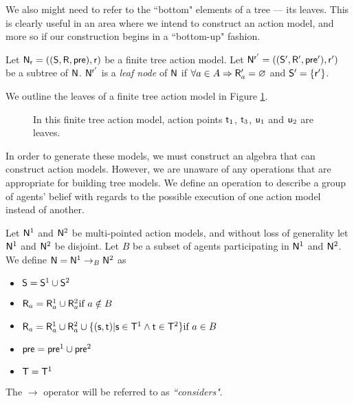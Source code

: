 We also might need to refer to the ``bottom" elements of a tree --- its leaves.
This is clearly useful in an area where we intend to construct an action model, and more so if our
construction begins in a ``bottom-up" fashion.

\begin{defn} \label{leaf}
Let $\mathrm{\mathsf{N}}_\mathrm{\mathsf{r}} = ((\mathrm{\mathsf{S}}, \mathrm{\mathsf{R}}, \mathrm{\mathsf{pre}}), \mathrm{\mathsf{r}})$ be a finite tree action model.
Let $\mathrm{\mathsf{N}}^{\mathrm{\mathsf{r}}'} = ((\mathrm{\mathsf{S}}', \mathrm{\mathsf{R}}', \mathrm{\mathsf{pre}}'), \mathrm{\mathsf{r}}')$ be a subtree of $\mathrm{\mathsf{N}}$.
$\mathrm{\mathsf{N}}^{\mathrm{\mathsf{r}}'}$ is a {\em leaf node} of $\mathrm{\mathsf{N}}$ if $\forall a \in A \Rightarrow \mathrm{\mathsf{R}}'_a = \varnothing$ and $\mathrm{\mathsf{S}}' = \{
\mathrm{\mathsf{r}}'\}$.
\end{defn}

We outline the leaves of a finite tree action model in Figure \ref{figure:exampleLeaves}.

\begin{figure}
	\centering
{}
	\caption[Example leaves]{In this finite tree action model, action points $\mathrm{\mathsf{t}}_1$, $\mathrm{\mathsf{t}}_3$, $\mathrm{\mathsf{u}}_1$ and
	$\mathrm{\mathsf{u}}_2$ are leaves.}
	\label{figure:exampleLeaves}
\end{figure}

In order to generate these models, we must construct an algebra that can construct action models.
However, we are unaware of any operations that are appropriate for building tree models.
We define an operation to describe a group of agents' belief with regards to the possible execution
of one action model instead of another.

\begin{defn} \label{considers}
Let $\mathrm{\mathsf{N}}^1$ and $\mathrm{\mathsf{N}}^2$ be multi-pointed action models, and without loss of
generality let $\mathrm{\mathsf{N}}^1$ and $\mathrm{\mathsf{N}}^2$ be disjoint.
Let $B$ be a subset of agents participating in $\mathrm{\mathsf{N}}^1$ and $\mathrm{\mathsf{N}}^2$.
We define $\mathrm{\mathsf{N}} = \mathrm{\mathsf{N}}^1 \to_B \mathrm{\mathsf{N}}^2$ as 
\begin{itemize}
  \item $\mathrm{\mathsf{S}} = \mathrm{\mathsf{S}}^1 \cup \mathrm{\mathsf{S}}^2$
  \item $\mathrm{\mathsf{R}}_a = \mathrm{\mathsf{R}}^1_a \cup \mathrm{\mathsf{R}}^2_a \text{if } a \notin B$
	\item $\mathrm{\mathsf{R}}_a =
      \mathrm{\mathsf{R}}^1_a \cup
      \mathrm{\mathsf{R}}^2_a \cup
      \{(\mathrm{\mathsf{s}},\mathrm{\mathsf{t}}) | \mathrm{\mathsf{s}} \in \mathrm{\mathsf{T}}^1 \land \mathrm{\mathsf{t}} \in \mathrm{\mathsf{T}}^2 \}
    \text{if } a \in B $
  \item $\mathrm{\mathsf{pre}} = \mathrm{\mathsf{pre}}^1 \cup \mathrm{\mathsf{pre}}^2$
  \item $\mathrm{\mathsf{T}} = \mathrm{\mathsf{T}}^1$
\end{itemize}
The $\to$ operator will be referred to as {\em ``considers"}.
\end{defn}


